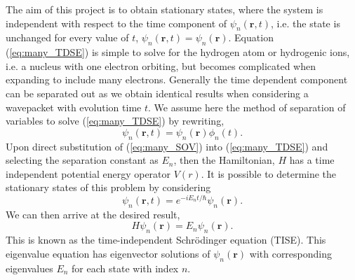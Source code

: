 The aim of this project is to obtain stationary states, where the system is independent with respect to the time component of $\psi_n(\boldsymbol{r},t)$, i.e. the state is unchanged for every value of $t$, $\psi_n(\boldsymbol{r},t) =\psi_n(\boldsymbol{r})$. Equation (\ref{eq:many_TDSE}) is simple to solve for the hydrogen atom or hydrogenic ions, i.e. a nucleus with one electron orbiting, but becomes complicated when expanding to include many electrons. Generally the time dependent component can be separated out as we obtain identical results when considering a wavepacket with evolution time $t$. We assume here the method of separation of variables to solve (\ref{eq:many_TDSE}) by rewriting,
	\begin{equation}\label{eq:many_SOV}
	\psi_n(\boldsymbol{r},t)=\psi_n(\boldsymbol{r})\phi_n(t).
	\end{equation}
Upon direct substitution of (\ref{eq:many_SOV}) into (\ref{eq:many_TDSE}) and selecting the separation constant as $E_n$, then the Hamiltonian, $H$ has a time independent potential energy operator $V(r)$. It is possible to determine the stationary states of this problem by considering
	\begin{equation}\label{eq:many_TDwave}
	\psi_n(\boldsymbol{r},t)=e^{-iE_nt/\hbar}\psi_n(\boldsymbol{r}).
	\end{equation}
We can then arrive at the desired result,
	\begin{equation}\label{eq:many_TISE}
	H\psi_n(\boldsymbol{r})=E_n\psi_n(\boldsymbol{r}).
	\end{equation}
This is known as the time-independent Schr\"{o}dinger equation (TISE). This eigenvalue equation has eigenvector solutions of $\psi_n(\boldsymbol{r})$ with corresponding eigenvalues $E_n$ for each state with index $n$.

